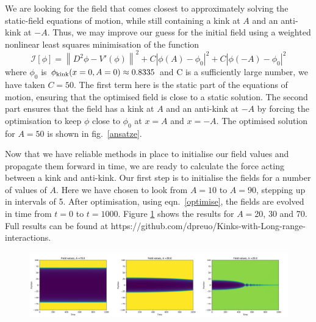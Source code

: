 \documentclass[11pt, oneside]{article}  	%
\numberwithin{equation}{section}
\begin{document}
 We are looking for the field that comes closest to approximately solving the static-field equations of motion, while still containing a kink at $A$ and an anti-kink at $-A$. Thus, we may improve our guess for the initial field using a weighted nonlinear least squares minimisation of the function
 \begin{equation}\label{optimise}
 \mathcal{I}[\phi] = \left \| D^2\phi -V'\left( \phi \right) \right \|^2 + C\left | \phi(A) - \phi_0 \right |^2 + C\left | \phi(-A) - \phi_0 \right |^2
 \end{equation}
 where $\phi_0$ is $\phi_{\textup{kink}}(x=0,A=0) \approx 0.8335$ and C is a sufficiently large number, we have taken $C = 50$. The first term here is the static part of the equations of motion, ensuring that the optimised field is close to a static solution. The second part ensures that the field has a kink at $A$ and an anti-kink at $-A$ by forcing the optimisation to keep $\phi$ close to $\phi_0$ at $x=A$ and $x=-A$. The optimised solution for $A=50$ is shown in fig.~\ref{ansatze}.\par
 Now that we have reliable methods in place to initialise our field values and propagate them forward in time, we are ready to calculate the force acting between a kink and anti-kink. Our first step is to initialise the fields for a number of values of $A$. Here we have chosen to look from $A=10$ to $A = 90$, stepping up in intervals of 5. After optimisation, using eqn.~\ref{optimise}, the fields are evolved in time from $t=0$ to $t=1000$. Figure \ref{field_evolutions} shows the results for $A =$20, 30 and 70. Full results can be found at https://github.com/dpreuo/Kinks-with-Long-range-interactions.\par
 \begin{figure}
\centering
\includegraphics[width=\textwidth]{field_values}
 \label{field_evolutions}
\end{figure}
\end{document}

